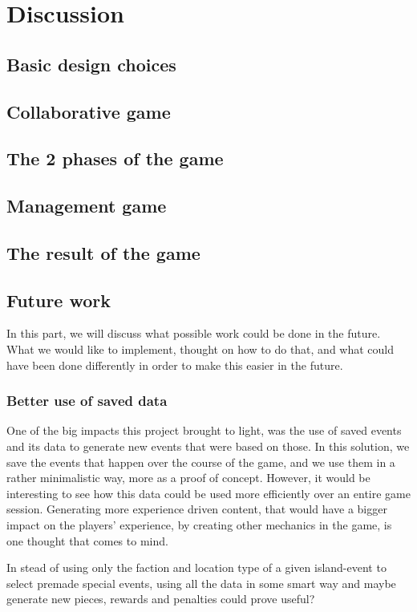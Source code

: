 \section{Discussion}
\subsection{Basic design choices} 
\subsection{Collaborative game} 
\subsection{The 2 phases of the game}
\subsection{Management game}
\subsection{The result of the game}
\subsection{Future work}
In this part, we will discuss what possible work could be done in the future. What we would like to implement, thought on how to do that, and what could have been done differently in order to make this easier in the future.
\subsubsection{Better use of saved data}
One of the big impacts this project brought to light, was the use of saved events and its data to generate new events that were based on those. In this solution, we save the events that happen over the course of the game, and we use them in a rather minimalistic way, more as a proof of concept. However, it would be interesting to see how this data could be used more efficiently over an entire game session. Generating more experience driven content, that would have a bigger impact on the players' experience, by creating other mechanics in the game, is one thought that comes to mind. 

In stead of using only the faction and location type of a given island-event to select premade special events, using all the data in some smart way and maybe generate new pieces, rewards and penalties could prove useful? 

